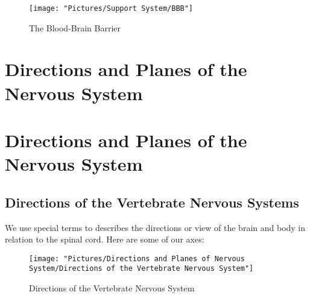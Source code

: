 \documentclass[12pt,a4paper]{article}
\begin{document}
	
\begin{figure}
	\centering
	\texttt{[image: "Pictures/Support System/BBB"]}
	\caption{The Blood-Brain Barrier}
	\label{fig:bbb}
\end{figure}
	
	\section*{Directions and Planes of the Nervous System}
	
	\section{Directions and Planes of the Nervous System}
	
	\subsection{Directions of the Vertebrate Nervous Systems}
	
	We use special terms to describes the directions or view of the brain and body in relation to the spinal cord. Here are some of our axes:
	
	
\begin{figure}
	\centering
	\texttt{[image: "Pictures/Directions and Planes of Nervous System/Directions of the Vertebrate Nervous System"]}
	\caption{Directions of the Vertebrate Nervous System}
	\label{fig:directions-of-the-vertebrate-nervous-system}
\end{figure}
	
\end{document}
